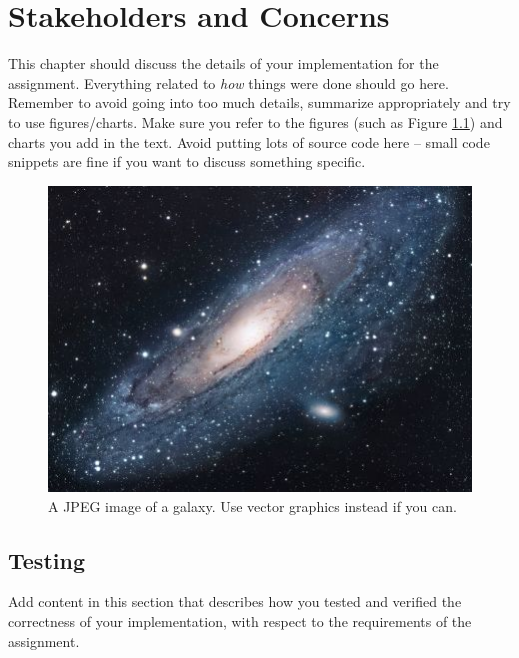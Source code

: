 \chapter{Stakeholders and Concerns}
This chapter should discuss the details of your implementation for the assignment. 
Everything related to \emph{how} things were done should go here.
Remember to avoid going into too much details, summarize appropriately and try to use figures/charts.
Make sure you refer to the figures (such as Figure \ref{fig:universe}) and charts you add in the text.
Avoid putting lots of source code here -- small code snippets are fine if you want to discuss something specific.

\begin{figure}
\centering
\includegraphics[scale=1.7]{images/universe.jpg}
\caption{A JPEG image of a galaxy. Use vector graphics instead if you can.}
\label{fig:universe}
\end{figure}

\section{Testing}
Add content in this section that describes how you tested and verified the correctness of your implementation, with respect to the requirements of the assignment.